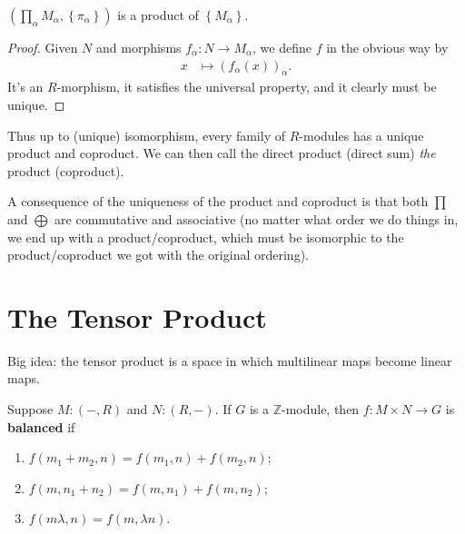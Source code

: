 \documentclass[twoside,10pt]{report}
\begin{document}
\begin{thrm}[Existence]
	$\left(\prod_{\alpha} M_{\alpha}, \left\{ \pi_{\alpha} \right\}\right)$ is a product of $\left\{ M_{\alpha} \right\}$.
\end{thrm}
\begin{proof}
	Given $N$ and morphisms $f_{\alpha}:N\to M_{\alpha}$, we define $f$ in the obvious way by
	\begin{align*}
		x &\mapsto (f_{\alpha}(x))_{\alpha}.
	\end{align*}
	It's an $R$-morphism, it satisfies the universal property, and it clearly must be unique.
\end{proof}

\begin{note}[]
	Thus up to (unique) isomorphism, every family of $R$-modules has a unique product and coproduct. We can then call the direct product (direct sum) \textit{the} product (coproduct).
\end{note}


A consequence of the uniqueness of the product and coproduct is that both $\prod$ and $\bigoplus$ are commutative and associative (no matter what order we do things in, we end up with a product/coproduct, which must be isomorphic to the product/coproduct we got with the original ordering).



\section{The Tensor Product}


\begin{note}[]
Big idea: the tensor product is a space in which multilinear maps become linear maps.
\end{note}

\begin{defn}[]
	Suppose $M:(-,R)$ and $N:(R,-)$. If $G$ is a $\mathbb{Z}$-module, then $f:M\times N\to G$ is \textbf{balanced} if
\begin{enumerate}
	\item $f(m_1+m_2,n)=f(m_1,n)+f(m_2,n)$;
	\item $f(m,n_1+n_2)=f(m,n_1)+f(m,n_2)$;
	\item $f(m \lambda,n)=f(m,\lambda n)$.
\end{enumerate}
\end{defn}
\end{document}
